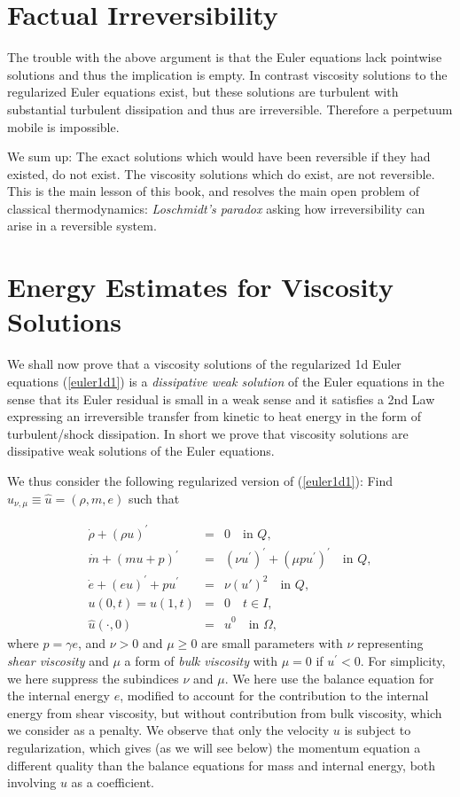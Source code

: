 \section{Factual Irreversibility}
The trouble with the above argument is that
the Euler equations lack pointwise solutions and thus
the implication is empty. In contrast viscosity solutions
to the regularized Euler equations exist, but these solutions
are turbulent with substantial turbulent dissipation 
and thus are irreversible. Therefore a perpetuum mobile is
impossible.

We sum up: The exact solutions which would have been reversible if they
had existed, do not exist. The viscosity solutions which do exist, 
are not reversible. This is the main lesson of this book, and resolves the 
main open problem of classical thermodynamics: \emph{Loschmidt's paradox}
asking how irreversibility can arise in a reversible system.

\section{Energy Estimates for Viscosity Solutions}


We shall now prove that a viscosity solutions 
of the regularized 1d Euler equations 
(\ref{euler1d1}) is a \emph{dissipative weak solution} of the Euler
equations in the sense that its Euler residual 
is small in a weak sense and it satisfies a 2nd Law 
expressing an irreversible transfer
from kinetic to heat energy in the form of turbulent/shock dissipation.
In short we prove that viscosity solutions are dissipative weak
solutions of the Euler equations.

We thus consider the following 
regularized version
of (\ref{euler1d1}): Find $\hat u_{\nu ,\mu}\equiv\hat u=(\rho ,m,e)$ such that

\begin{equation}\label{euler1dreg}
\begin{array}{rcl}
\dot \rho +(\rho u )^\prime&=&  0 \quad \mbox{in } Q, \\
\dot m +(mu +p)^\prime &=&(\nu u^{\prime})^\prime +(\mu pu^\prime )^\prime \quad \mbox{in } Q, \\
\dot e +(eu)^\prime +pu^\prime &=&  \nu (u')^2 \quad \mbox{in } Q, \\
u(0,t)=u(1,t)&=&0\quad  t\in I,\\
\hat u(\cdot ,0)&=&\hat u^0\quad \mbox{in } \Omega , 
\end{array} 
\end{equation}
where $p=\gamma e$, and 
$\nu >0$ and $\mu\ge 0$ are small parameters with $\nu$ representing
\emph{shear viscosity} and $\mu$ a form of \emph{bulk viscosity}
with $\mu =0$ if $u^\prime <0$. For
simplicity, we here suppress the subindices $\nu$ and  $\mu$. We here
use the balance equation for the internal energy $e$,  modified
to account for the contribution to the internal energy from 
shear viscosity, but without contribution from bulk viscosity,
which we consider as a penalty.
We observe that only the velocity $u$ 
is subject to regularization, which gives (as we will see below) 
the momentum equation
a different quality than the balance equations for 
mass and internal energy, both involving $u$ as a coefficient.

